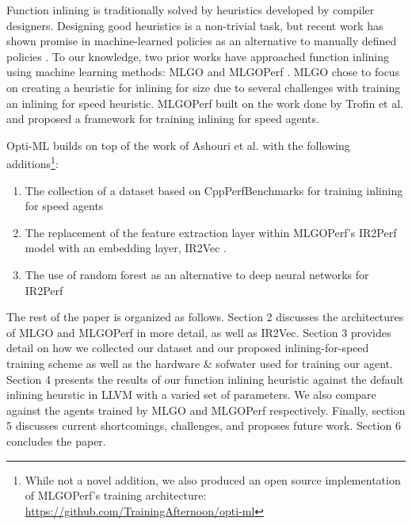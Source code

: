 \documentclass[nohyperref]{article}
\theoremstyle{plain}
\theoremstyle{definition}
\theoremstyle{remark}
\begin{document}
Function inlining is traditionally solved by heuristics developed by compiler designers. Designing good heuristics is a non-trivial task, but recent work has shown promise in machine-learned policies as an alternative to manually defined policies \cite{mlgo}. To our knowledge, two prior works have approached function inlining using machine learning methods: MLGO \cite{mlgo} and MLGOPerf \cite{mlgoperf}. MLGO chose to focus on creating a heuristic for inlining for size due to several challenges with training an inlining for speed heuristic. MLGOPerf built on the work done by Trofin et al. and proposed a framework for training inlining for speed agents.

Opti-ML builds on top of the work of Ashouri et al. with the following additions\footnote{While not a novel addition, we also produced an open source implementation of MLGOPerf's training architecture: \href{https://github.com/TrainingAfternoon/opti-ml}{https://github.com/TrainingAfternoon/opti-ml}}:
\begin{enumerate}
    \item The collection of a dataset based on CppPerfBenchmarks \cite{cpp-perf-benchmarks} for training inlining for speed agents
    \item The replacement of the feature extraction layer within MLGOPerf's IR2Perf model with an embedding layer, IR2Vec \cite{ir2vec}. %
    \item The use of random forest as an alternative to deep neural networks for IR2Perf
\end{enumerate}

The rest of the paper is organized as follows. Section 2 discusses the architectures of MLGO and MLGOPerf in more detail, as well as IR2Vec. Section 3 provides detail on how we collected our dataset and our proposed inlining-for-speed training scheme as well as the hardware \& sofwater used for training our agent. Section 4 presents the results of our function inlining heuristic against the default inlining heurstic in LLVM with a varied set of parameters. We also compare against the agents trained by MLGO and MLGOPerf respectively. Finally, section 5 discusses current shortcomings, challenges, and proposes future work. Section 6 concludes the paper.
\end{document}

